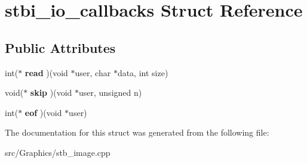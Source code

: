 \hypertarget{structstbi__io__callbacks}{\section{stbi\+\_\+io\+\_\+callbacks Struct Reference}
\label{structstbi__io__callbacks}
}
\subsection*{Public Attributes}
\begin{DoxyCompactItemize}
\item 
\hypertarget{structstbi__io__callbacks_a73818f0a4f467e5abfefb1d635f62d82}{int($\ast$ {\bfseries read} )(void $\ast$user, char $\ast$data, int size)}\label{structstbi__io__callbacks_a73818f0a4f467e5abfefb1d635f62d82}

\item 
\hypertarget{structstbi__io__callbacks_afe8270ea04f0c16cdb63f378469df356}{void($\ast$ {\bfseries skip} )(void $\ast$user, unsigned n)}\label{structstbi__io__callbacks_afe8270ea04f0c16cdb63f378469df356}

\item 
\hypertarget{structstbi__io__callbacks_a2c4f3c3b7c75a2e74a35caf74fb8d177}{int($\ast$ {\bfseries eof} )(void $\ast$user)}\label{structstbi__io__callbacks_a2c4f3c3b7c75a2e74a35caf74fb8d177}

\end{DoxyCompactItemize}


The documentation for this struct was generated from the following file\+:\begin{DoxyCompactItemize}
\item 
src/\+Graphics/stb\+\_\+image.\+cpp\end{DoxyCompactItemize}
